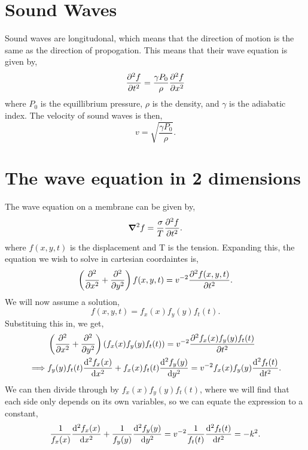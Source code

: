 \documentclass{book}
\begin{document}
\section{Sound Waves}
Sound waves are longitudonal, which means that the direction of motion is the same as the direction of propogation. This means that their wave equation is given by,
\begin{equation}
	\pdv[2]{f}{t} = \frac{\gamma P_0}{\rho}\pdv[2]{f}{x}
\end{equation}
where $P_0$ is the equillibrium pressure, $\rho$ is the density, and $\gamma$ is the adiabatic index. The velocity of sound waves is then,
\begin{equation}
	v = \sqrt{\frac{\gamma P_0}{\rho}}.
\end{equation}

\section{The wave equation in 2 dimensions}
The wave equation on a membrane can be given by,
\begin{equation}
	\grad^2 f = \frac{\sigma}{T} \pdv[2]{f}{t}.
\end{equation}
where $f(x,y,t)$ is the displacement and T is the tension. Expanding this, the equation we wish to solve in cartesian coordaintes is,
\begin{equation}
	\left(\pdv[2]{}{x} + \pdv[2]{}{y}\right)f(x,y,t) = v^{-2}\pdv[2]{f(x,y,t)}{t}.
\end{equation}
We will now assume a solution,
\begin{equation}
	f(x,y,t) = f_x(x)f_y(y)f_t(t).
\end{equation}
Substituing this in, we get, 
\begin{equation}
	\begin{split}
		& \left(\pdv[2]{}{x} + \pdv[2]{}{y}\right)\left(f_x(x)f_y(y)f_t(t)\right) = v^{-2}\pdv[2]{f_x(x)f_y(y)f_t(t)}{t} \\
		\implies & f_y(y)f_t(t)\dv[2]{f_x(x)}{x} + f_x(x)f_t(t)\dv[2]{f_y(y)}{y} = v^{-2}f_x(x)f_y(y)\dv[2]{f_t(t)}{t}.
	\end{split}
\end{equation}
We can then divide through by $f_x(x)f_y(y)f_t(t)$, where we will find that each side only depends on its own variables, so we can equate the expression to a constant,
\begin{equation}
	\frac{1}{f_x(x)}\dv[2]{f_x(x)}{x} + \frac{1}{f_y(y)}\dv[2]{f_y(y)}{y} = v^{-2}\frac{1}{f_t(t)}\dv[2]{f_t(t)}{t} = -k^2.
\end{equation}
\end{document}
